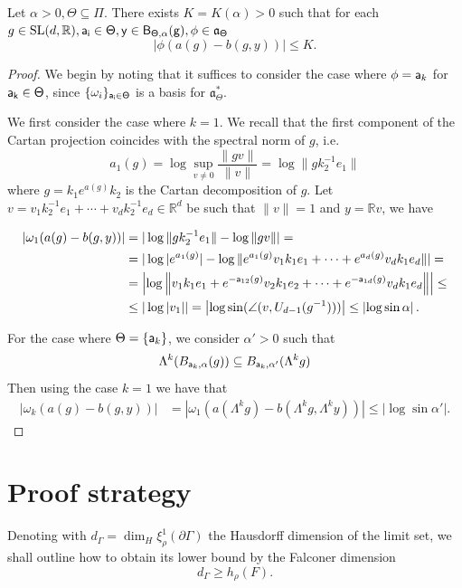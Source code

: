 \documentclass{report}
\begin{document}
\begin{lemma}\label{lem:busemann}
Let $\alpha > 0, \Theta \subseteq \Pi$.
There exists $K = K(\alpha) > 0$ such that for each $g \in \operatorname{{\mathrm{SL}}}(d, \mathbb R), \sf{a_i} \in \Theta, y \in B_{\Theta, \alpha}(g), \phi \in \mathfrak a_\Theta$
\[
    |\phi (a(g) - b(g, y))| \leq K.
\]
\end{lemma}\begin{proof}
We begin by noting that it suffices to consider the case where $\phi = {\sf a}_k$
for $\sf a_k \in \Theta$, since $\{ \omega_i \}_{\sf a_i \in \Theta} $ 
is a basis for $\mathfrak a_\Theta^*$.

We first consider the case where $k=1$.
We recall that the first component of the Cartan projection coincides with the spectral norm of $g$, i.e.
\[
a_1(g) = \log \sup_{v \neq 0} \frac{\| g v\|}{\|v\|} = \log \|g k_2^{-1} e_1 \|
\] 
where $g = k_1 e^{a(g)} k_2$ is the Cartan decomposition of $g$.
Let $v = v_1 k_2^{-1} e_1 + \cdots + v_d k_2^{-1} e_d \in \mathbb R^d$ be such that $\|v\| = 1$ and $y = \mathbb R v$, we have

\begin{align*}
    |\omega_1(a(g) - b(g, y))| &=
    |\log \|g k_2^{-1} e_1 \| - \log \|g v \| | =\\
    &= |\log |e^{a_1(g)}| - \log \| e^{a_1(g)} v_1 k_1 e_1 + \cdots + e^{a_d(g)} v_d k_1 e_d \| | =\\
    &= \left| \log \left\| v_1 k_1 e_1 + e^{-{\sf a}_{12}(g)} v_2 k_1 e_2 + \cdots
    +  e^{-{\sf a}_{1d}(g)} v_d k_1 e_d \right\| \right| \leq\\
    &\leq |\log |v_1| | = \left| \log \sin( \angle(v, U_{d-1}(g^{-1}))) \right| \leq \left| \log \sin \alpha \right|.
\end{align*}

For the case where $\Theta = \{ {\sf a}_k \}$, we consider $\alpha' > 0$ such that
\[
\Lambda^k (B_{{\sf a}_k, \alpha}(g)) \subseteq B_{{\sf a}_k, \alpha'}(\Lambda^k g)
\]
Then using the case $k=1$ we have that
\begin{align*}
    |\omega_k(a(g) - b(g, y))| &=
    |\omega_1(a(\Lambda^k g) - b(\Lambda^k g, \Lambda^k y))| \leq \left| \log \sin \alpha' \right| .
\end{align*}
\end{proof}

\section{Proof strategy}
Denoting with $d_\Gamma = \dim_H \xi_\rho^1(\partial \Gamma)$ the Hausdorff  dimension of the limit set, we shall outline how to obtain its lower bound by the Falconer dimension
\[
    d_\Gamma \geq h_\rho(F).
\]
\end{document}
